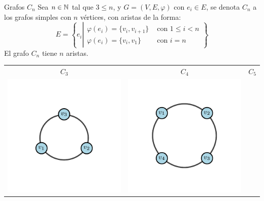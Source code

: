         \begin{definition}{Grafos $C_n$}
            Sea $n\in\mathbb{N}$ tal que $3\le n$, y $G=(V,E,\varphi)$ con $e_i\in E$, se denota $C_n$ a los grafos simples con $n$ vértices, con aristas de la forma:
            \[
                E=\left\{e_i\left|
                    \begin{array}{cl}
                        \varphi(e_i)=\{v_i,v_{i+1}\} & \text{ con }1\le i<n \\ 
                        \varphi(e_i)=\{v_i,v_1\} & \text{ con }i=n 
                    \end{array} 
                \right.\right\}
            \]
            El grafo $C_n$ tiene $n$ aristas.
        \end{definition}
        \begin{table}[H]
            \begin{center}
                \begin{tabular}{ccc}
                    \textbf{$C_3$} & \textbf{$C_4$} & \textbf{$C_5$} \\
                    \includegraphics{Sections/Graphs/GraphsImages/GraphsCn/C3.pdf}
                    \centering 
                    &
                    \includegraphics{Sections/Graphs/GraphsImages/GraphsCn/C4.pdf}

\end{tabular}
\end{center}
\end{table}
